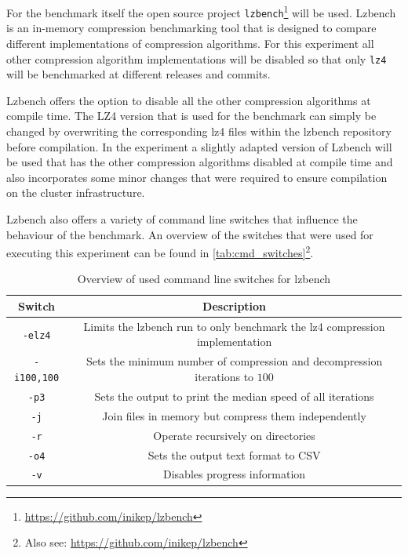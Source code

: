 \documentclass[	runningheads,
				a4paper]{llncs}
\begin{document}
	For the benchmark itself the open source project \texttt{lzbench}\footnote{\url{https://github.com/inikep/lzbench}} will be used. Lzbench is an in-memory compression benchmarking tool that is designed to compare different implementations of compression algorithms. For this experiment all other compression algorithm implementations will be disabled so that only \texttt{lz4} will be benchmarked at different releases and commits. 
	
	Lzbench offers the option to disable all the other compression algorithms at compile time. The LZ4 version that is used for the benchmark can simply be changed by overwriting the corresponding lz4 files within the lzbench repository before compilation. In the experiment a slightly adapted version of Lzbench will be used that has the other compression algorithms disabled at compile time and also incorporates some minor changes that were required to ensure compilation on the cluster infrastructure.

	Lzbench also offers a variety of command line switches that influence the behaviour of the benchmark. An overview of the switches that were used for executing this experiment can be found in \autoref{tab:cmd_switches}\footnote{Also see: \url{https://github.com/inikep/lzbench}}.

	\begin{table}
		\caption{Overview of used command line switches for lzbench}
		\label{tab:cmd_switches}
		\centering
		\begin{tabular}{|c|c|}
			\hline
			\textbf{Switch} & \textbf{Description}\\
			\hline\hline
			\texttt{-elz4} & Limits the lzbench run to only benchmark the lz4 compression implementation \\
			\hline
			\texttt{-i100,100} & Sets the minimum number of compression and decompression iterations to $100$ \\
			\hline
			\texttt{-p3} & Sets the output to print the median speed of all iterations \\
			\hline
			\texttt{-j} & Join files in memory but compress them independently \\
			\hline
			\texttt{-r} & Operate recursively on directories \\
			\hline 
			\texttt{-o4} & Sets the output text format to CSV \\
			\hline
			\texttt{-v} & Disables progress information \\
			\hline
		\end{tabular}
	\end{table}
	
\end{document}
